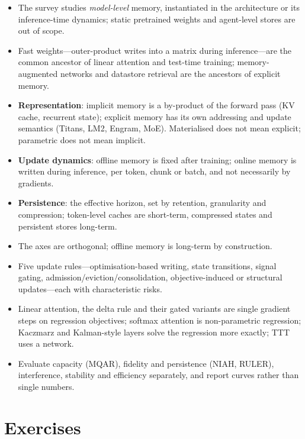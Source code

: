 \begin{summarybox}
\begin{itemize}[itemsep=0pt]
  \item The survey studies \emph{model-level} memory, instantiated in the architecture or its
        inference-time dynamics; static pretrained weights and agent-level stores are out of scope.
  \item Fast weights---outer-product writes into a matrix during inference---are the common ancestor
        of linear attention and test-time training; memory-augmented networks and datastore
        retrieval are the ancestors of explicit memory.
  \item \textbf{Representation}: implicit memory is a by-product of the forward pass (KV cache,
        recurrent state); explicit memory has its own addressing and update semantics (Titans, LM2,
        Engram, MoE). Materialised does not mean explicit; parametric does not mean implicit.
  \item \textbf{Update dynamics}: offline memory is fixed after training; online memory is written
        during inference, per token, chunk or batch, and not necessarily by gradients.
  \item \textbf{Persistence}: the effective horizon, set by retention, granularity and compression;
        token-level caches are short-term, compressed states and persistent stores long-term.
  \item The axes are orthogonal; offline memory is long-term by construction.
  \item Five update rules---optimisation-based writing, state transitions, signal gating,
        admission/eviction/consolidation, objective-induced or structural updates---each with
        characteristic risks.
  \item Linear attention, the delta rule and their gated variants are single gradient steps on
        regression objectives; softmax attention is non-parametric regression; Kaczmarz and
        Kalman-style layers solve the regression more exactly; TTT uses a network.
  \item Evaluate capacity (MQAR), fidelity and persistence (NIAH, RULER), interference, stability and
        efficiency separately, and report curves rather than single numbers.
\end{itemize}
\end{summarybox}

\section*{Exercises}

